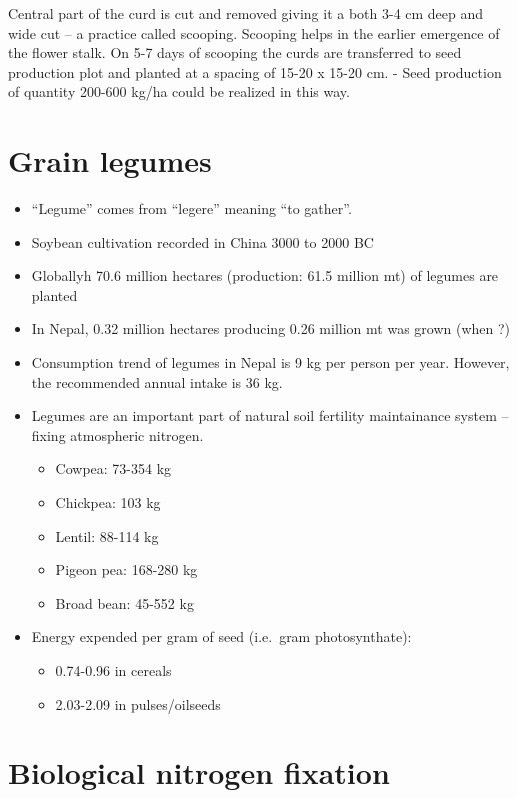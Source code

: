 \documentclass[
  openany]{book}
\providecommand{\tightlist}{%
  \setlength{\itemsep}{0pt}\setlength{\parskip}{0pt}}
\begin{document}
Central part of the curd is cut and removed giving it a both 3-4 cm deep and wide cut -- a practice called scooping. Scooping helps in the earlier emergence of the flower stalk. On 5-7 days of scooping the curds are transferred to seed production plot and planted at a spacing of 15-20 x 15-20 cm.
- Seed production of quantity 200-600 kg/ha could be realized in this way.

\hypertarget{grain-legumes}{%
\section{Grain legumes}\label{grain-legumes}}

\begin{itemize}
\tightlist
\item
  ``Legume'' comes from ``legere'' meaning ``to gather''.
\item
  Soybean cultivation recorded in China 3000 to 2000 BC
\item
  Globallyh 70.6 million hectares (production: 61.5 million mt) of legumes are planted
\item
  In Nepal, 0.32 million hectares producing 0.26 million mt was grown (when ?)
\item
  Consumption trend of legumes in Nepal is 9 kg per person per year. However, the recommended annual intake is 36 kg.
\item
  Legumes are an important part of natural soil fertility maintainance system -- fixing atmospheric nitrogen.

  \begin{itemize}
  \tightlist
  \item
    Cowpea: 73-354 kg
  \item
    Chickpea: 103 kg
  \item
    Lentil: 88-114 kg
  \item
    Pigeon pea: 168-280 kg
  \item
    Broad bean: 45-552 kg
  \end{itemize}
\item
  Energy expended per gram of seed (i.e.~gram photosynthate):

  \begin{itemize}
  \tightlist
  \item
    0.74-0.96 in cereals
  \item
    2.03-2.09 in pulses/oilseeds
  \end{itemize}
\end{itemize}

\hypertarget{biological-nitrogen-fixation}{%
\section{Biological nitrogen fixation}\label{biological-nitrogen-fixation}}
\end{document}
